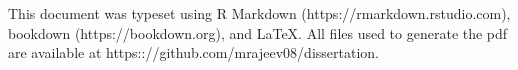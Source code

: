 \backmatter

\pagestyle{empty}

\hfill

\vfill


\section*{}
This document was typeset using R Markdown (https://rmarkdown.rstudio.com), bookdown (https://bookdown.org), and
\LaTeX. All files used to generate the pdf are available at https:://github.com/mrajeev08/dissertation. 
